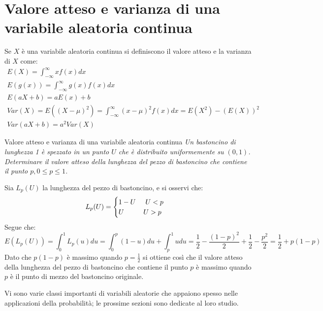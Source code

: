 \section{Valore atteso e varianza di una variabile aleatoria continua}
Se $X$ è una variabile aleatoria continua si definiscono il valore atteso e la varianza di $X$ come:
\begin{gather*}
    E(X)=\int^\infty_{-\infty}xf(x)dx\\
    E(g(x))=\int^\infty_{-\infty}g(x)f(x)dx\\
    E(aX+b)=aE(x)+b\\
    Var(X)=E((X-\mu)^2)=\int^\infty_{-\infty}(x-\mu)^2f(x)dx=E(X^2)-(E(X))^2\\
    Var(aX+b)=a^2Var(X)
\end{gather*}

\begin{Example}{Valore atteso e varianza di una variabile aleatoria continua}{}
    \textit{Un bastoncino di lunghezza 1 è spezzato in un punto $U$ che è distribuito uniformemente su $(0,1)$. Determinare il valore atteso della lunghezza del pezzo di bastoncino che contiene il punto $p,0\leq p\leq 1$.}

    Sia $L_p(U)$ la lunghezza del pezzo di bastoncino, e si osservi che:
    \begin{equation*}
        L_p(U)=\begin{cases}
            1-U\hspace{0.5cm}U<p\\U\hspace{1cm}U>p
        \end{cases}
    \end{equation*}
    Segue che:
    \begin{equation*}
        E(L_p(U))=\int^1_0L_p(u)du=\int^p_0(1-u)du+\int^1_pudu=\frac{1}{2}-\frac{(1-p)^2}{2}+\frac{1}{2}-\frac{p^2}{2}=\frac{1}{2}+p(1-p)
    \end{equation*}
    Dato che $p(1 - p)$ è massimo quando $p =\frac{1}{2}$ si ottiene così che il valore atteso della lunghezza del pezzo di bastoncino che contiene il punto $p$ è massimo quando $p$ è il punto di mezzo del bastoncino originale. 
\end{Example}

Vi sono varie classi importanti di variabili aleatorie che appaiono spesso nelle applicazioni della probabilità; le prossime sezioni sono dedicate al loro studio.

